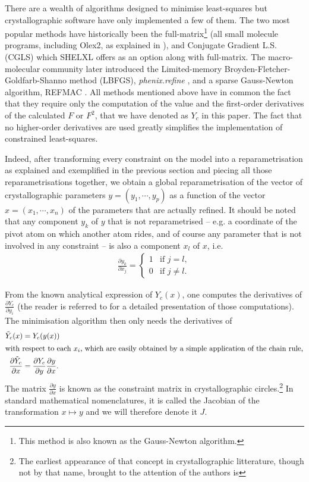 \documentclass[pdf]{iucr}
\newcommand{\partialder}[2]{\frac{\partial #1}{\partial #2}}
\begin{document}
There are a wealth of algorithms designed to minimise least-squares but crystallographic software have only implemented a few of them. The two most popular methods have historically been the full-matrix\footnote{This method is also known as the Gauss-Newton algorithm.} (all small molecule programs, including Olex2, as explained in ), and Conjugate Gradient L.S. (CGLS) which SHELXL offers as an option along with full-matrix.  The macro-molecular community later introduced the Limited-memory Broyden-Fletcher-Goldfarb-Shanno method (LBFGS), \emph{phenix.refine} , and a sparse Gauss-Newton algorithm, REFMAC . All methods mentioned above have in common the fact that they require only the computation of the value and the first-order derivatives of the calculated $F$ or $F^2$, that we have denoted as $Y_c$ in this paper. The fact that no higher-order derivatives are used greatly simplifies the implementation of constrained least-squares.

Indeed, after transforming every constraint on the model into a reparametrisation as explained and exemplified in the previous section and piecing all those reparametrisations together, we obtain a global reparametrisation of the vector of crystallographic parameters $y = (y_1, \cdots, y_p)$ as a function of the vector $x=(x_1, \cdots, x_n)$ of the parameters that are actually refined. It should be noted that any component $y_k$ of $y$ that is not reparametrised -- e.g. a coordinate of the pivot atom on which another atom rides, and of course any parameter that is not involved in any constraint --  is also a component $x_l$ of $x$, i.e. 
\begin{align}
\partialder{y_k}{x_j} = \begin{cases} 
   1& \text{if $j=l$},\\
   0& \text{if $j \neq l$}.
   \end{cases}
\nonumber
\end{align}

 From the known analytical expression of $Y_c(x)$, one computes the derivatives of $\partialder{Y_c}{y_i}$ (the reader is referred to  for a detailed presentation of those computations). The minimisation algorithm then only needs the derivatives of
\begin{align}
\tilde{Y}_c(x) &= Y_c(y(x)) \\
 \shortintertext{with respect to each $x_i$, which are easily obtained by a simple application of the chain rule,}
\partialder{\tilde{Y}_c}{x} &= \partialder{Y_c}{y} \partialder{y}{x}.
\label{eqn:chainrule}
\end{align}
The matrix $\partialder{y}{x}$ is known as the constraint matrix in crystallographic circles.\footnote{The earliest appearance of that concept in crystallographic litterature, though not by that name, brought to the attention of the authors is } In standard mathematical nomenclatures, it is called the Jacobian of the transformation $x \mapsto y$ and we will therefore denote it $J$.
\end{document}
